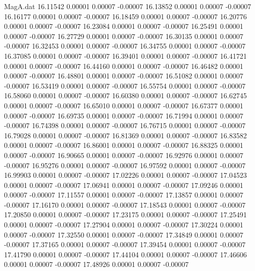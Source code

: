 \begin{filecontents}{MagA.dat}
  16.11542    0.00001    0.00007   -0.00007
  16.13852    0.00001    0.00007   -0.00007
  16.16177    0.00001    0.00007   -0.00007
  16.18459    0.00001    0.00007   -0.00007
  16.20776    0.00001    0.00007   -0.00007
  16.23084    0.00001    0.00007   -0.00007
  16.25491    0.00001    0.00007   -0.00007
  16.27729    0.00001    0.00007   -0.00007
  16.30135    0.00001    0.00007   -0.00007
  16.32453    0.00001    0.00007   -0.00007
  16.34755    0.00001    0.00007   -0.00007
  16.37085    0.00001    0.00007   -0.00007
  16.39401    0.00001    0.00007   -0.00007
  16.41721    0.00001    0.00007   -0.00007
  16.44160    0.00001    0.00007   -0.00007
  16.46482    0.00001    0.00007   -0.00007
  16.48801    0.00001    0.00007   -0.00007
  16.51082    0.00001    0.00007   -0.00007
  16.53419    0.00001    0.00007   -0.00007
  16.55754    0.00001    0.00007   -0.00007
  16.58060    0.00001    0.00007   -0.00007
  16.60380    0.00001    0.00007   -0.00007
  16.62745    0.00001    0.00007   -0.00007
  16.65010    0.00001    0.00007   -0.00007
  16.67377    0.00001    0.00007   -0.00007
  16.69735    0.00001    0.00007   -0.00007
  16.71994    0.00001    0.00007   -0.00007
  16.74398    0.00001    0.00007   -0.00007
  16.76715    0.00001    0.00007   -0.00007
  16.79028    0.00001    0.00007   -0.00007
  16.81369    0.00001    0.00007   -0.00007
  16.83582    0.00001    0.00007   -0.00007
  16.86001    0.00001    0.00007   -0.00007
  16.88325    0.00001    0.00007   -0.00007
  16.90665    0.00001    0.00007   -0.00007
  16.92976    0.00001    0.00007   -0.00007
  16.95276    0.00001    0.00007   -0.00007
  16.97592    0.00001    0.00007   -0.00007
  16.99903    0.00001    0.00007   -0.00007
  17.02226    0.00001    0.00007   -0.00007
  17.04523    0.00001    0.00007   -0.00007
  17.06941    0.00001    0.00007   -0.00007
  17.09246    0.00001    0.00007   -0.00007
  17.11557    0.00001    0.00007   -0.00007
  17.13857    0.00001    0.00007   -0.00007
  17.16170    0.00001    0.00007   -0.00007
  17.18543    0.00001    0.00007   -0.00007
  17.20850    0.00001    0.00007   -0.00007
  17.23175    0.00001    0.00007   -0.00007
  17.25491    0.00001    0.00007   -0.00007
  17.27904    0.00001    0.00007   -0.00007
  17.30224    0.00001    0.00007   -0.00007
  17.32550    0.00001    0.00007   -0.00007
  17.34849    0.00001    0.00007   -0.00007
  17.37165    0.00001    0.00007   -0.00007
  17.39454    0.00001    0.00007   -0.00007
  17.41790    0.00001    0.00007   -0.00007
  17.44104    0.00001    0.00007   -0.00007
  17.46606    0.00001    0.00007   -0.00007
  17.48926    0.00001    0.00007   -0.00007

\end{filecontents}
